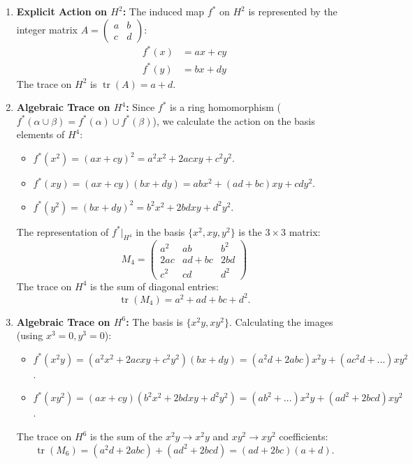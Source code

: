 \begin{solution}
\begin{enumerate}
    \item \textbf{Explicit Action on $H^2$:}
    The induced map $f^*$ on $H^2$ is represented by the integer matrix $A = \begin{pmatrix} a & b \\ c & d \end{pmatrix}$:
    \begin{align*}
        f^*(x) &= ax + cy \\
        f^*(y) &= bx + dy
    \end{align*}
    The trace on $H^2$ is $\operatorname{tr}(A) = a+d$.

    \item \textbf{Algebraic Trace on $H^4$:}
    Since $f^*$ is a ring homomorphism ($f^*(\alpha \cup \beta) = f^*(\alpha) \cup f^*(\beta)$), we calculate the action on the basis elements of $H^4$:
    \begin{itemize}
        \item $f^*(x^2) = (ax+cy)^2 = a^2 x^2 + 2ac xy + c^2 y^2$.
        \item $f^*(xy) = (ax+cy)(bx+dy) = ab x^2 + (ad+bc) xy + cd y^2$.
        \item $f^*(y^2) = (bx+dy)^2 = b^2 x^2 + 2bd xy + d^2 y^2$.
    \end{itemize}
    The representation of $f^*|_{H^4}$ in the basis $\{x^2, xy, y^2\}$ is the $3 \times 3$ matrix:
    \[ M_4 = \begin{pmatrix} a^2 & ab & b^2 \\ 2ac & ad+bc & 2bd \\ c^2 & cd & d^2 \end{pmatrix} \]
    The trace on $H^4$ is the sum of diagonal entries:
    \[ \operatorname{tr}(M_4) = a^2 + ad + bc + d^2. \]

    \item \textbf{Algebraic Trace on $H^6$:}
    The basis is $\{x^2y, xy^2\}$. Calculating the images (using $x^3=0, y^3=0$):
    \begin{itemize}
        \item $f^*(x^2y) = (a^2x^2 + 2acxy + c^2y^2)(bx+dy) = (a^2d + 2abc)x^2y + (ac^2d + \dots)xy^2$.
        \item $f^*(xy^2) = (ax+cy)(b^2x^2 + 2bdxy + d^2y^2) = (ab^2 + \dots)x^2y + (ad^2 + 2bcd)xy^2$.
    \end{itemize}
    The trace on $H^6$ is the sum of the $x^2y \to x^2y$ and $xy^2 \to xy^2$ coefficients:
    \[ \operatorname{tr}(M_6) = (a^2d + 2abc) + (ad^2 + 2bcd) = (ad + 2bc)(a+d). \]


\end{enumerate}
\end{solution}
